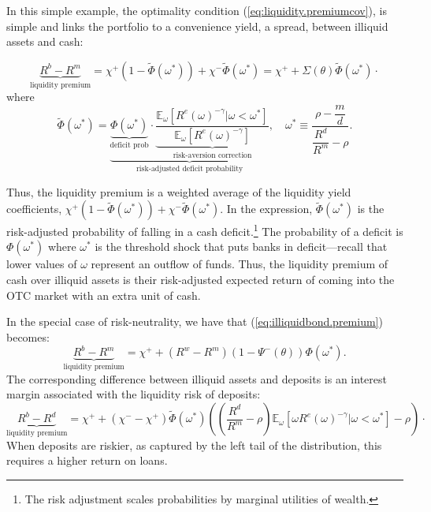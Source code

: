 \documentclass[12pt,american,english,notitlepage]{article}
\begin{document}
In this simple example, the optimality condition (\ref{eq:liquidity.premiumcov}),
is simple and links the portfolio to a convenience yield, a spread,
between illiquid assets and cash:

\begin{equation}
\underbrace{R^{b}-R^{m}}_{\text{liquidity premium}}=\chi^{+}\left(1-\tilde{\Phi}\left(\omega^{\ast}\right)\right)+\chi^{-}\tilde{\Phi}\left(\omega^{\ast}\right)=\chi^{+}+\Sigma\left(\theta\right)\tilde{\Phi}\left(\omega^{\ast}\right)\cdot\label{eq:illiquidbond.premium}
\end{equation}
where 
\[
\tilde{\Phi}\left(\omega^{\ast}\right)=\underbrace{\underset{\text{deficit prob}}{\underbrace{\Phi\left(\omega^{\ast}\right)}}\cdot\underset{\text{risk-aversion correction}}{\underbrace{\frac{\mathbb{E}_{\omega}\left[R^{e}(\omega)^{-\gamma}|\omega<\omega^{\ast}\right]}{\mathbb{E}_{\omega}\left[R^{e}(\omega)^{-\gamma}\right]}}}}_{\text{risk-adjusted deficit probability}},\quad\omega^{\ast}\equiv\frac{\rho-\dfrac{m}{d}}{\dfrac{R^{d}}{R^{m}}-\rho}.
\]

Thus, the liquidity premium is a weighted average of the liquidity
yield coefficients, $\chi^{+}\left(1-\tilde{\Phi}\left(\omega^{\ast}\right)\right)+\chi^{-}\tilde{\Phi}\left(\omega^{\ast}\right)$.
In the expression, $\tilde{\Phi}\left(\omega^{\ast}\right)$ is the
risk-adjusted probability of falling in a cash deficit.\footnote{The risk adjustment scales probabilities by marginal utilities of
wealth.} The probability of a deficit is $\Phi\left(\omega^{\ast}\right)$
where $\omega^{\ast}$ is the threshold shock that puts banks in deficit---recall
that lower values of $\omega$ represent an outflow of funds. Thus,
the liquidity premium of cash over illiquid assets is their risk-adjusted
expected return of coming into the OTC market with an extra unit
of cash.

In the special case of risk-neutrality, we have that (\ref{eq:illiquidbond.premium})
becomes:
\[
\underbrace{R^{b}-R^{m}}_{\text{liquidity premium}}=\chi^{+}+\left(R^{w}-R^{m}\right)\left(1-\Psi^{-}\left(\theta\right)\right)\Phi\left(\omega^{\ast}\right).
\]
The corresponding difference between illiquid assets and deposits is
an interest margin associated with the liquidity risk of deposits:
\begin{equation}
\underbrace{R^{b}-R^{d}}_{\text{liquidity premium}}=\chi^{+}+\left(\chi^{-}-\chi^{+}\right)\tilde{\Phi}\left(\omega^{\ast}\right)\left(\left(\frac{R^{d}}{R^{m}}-\rho\right)\mathbb{E}_{\omega}\left[\omega R^{e}(\omega)^{-\gamma}|\omega<\omega^{\ast}\right]-\rho\right)\cdot\label{eq:deposit.premium}
\end{equation}
When deposits are riskier, as captured by the left tail of the distribution, this requires a higher return on loans. 
\end{document}
